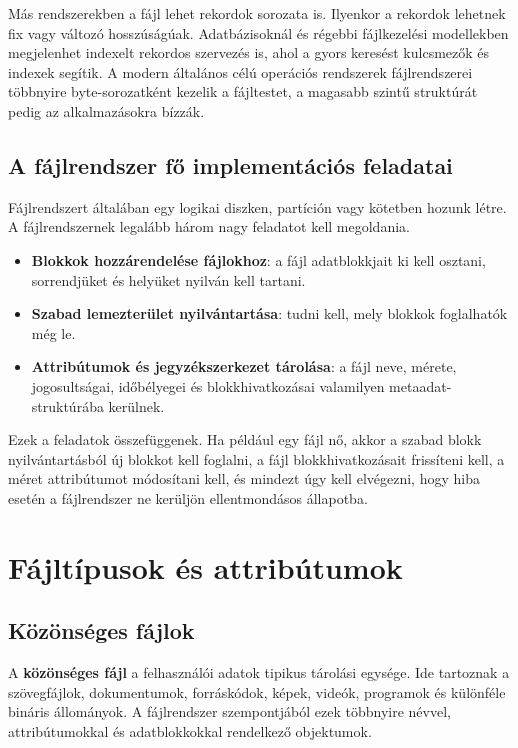 Más rendszerekben a fájl lehet rekordok sorozata is. Ilyenkor a rekordok lehetnek fix vagy változó hosszúságúak. Adatbázisoknál és régebbi fájlkezelési modellekben megjelenhet indexelt rekordos szervezés is, ahol a gyors keresést kulcsmezők és indexek segítik. A modern általános célú operációs rendszerek fájlrendszerei többnyire byte-sorozatként kezelik a fájltestet, a magasabb szintű struktúrát pedig az alkalmazásokra bízzák.

\subsection{A fájlrendszer fő implementációs feladatai}

Fájlrendszert általában egy logikai diszken, partíción vagy kötetben hozunk létre. A fájlrendszernek legalább három nagy feladatot kell megoldania.

\begin{itemize}
  \item \textbf{Blokkok hozzárendelése fájlokhoz}: a fájl adatblokkjait ki kell osztani, sorrendjüket és helyüket nyilván kell tartani.
  \item \textbf{Szabad lemezterület nyilvántartása}: tudni kell, mely blokkok foglalhatók még le.
  \item \textbf{Attribútumok és jegyzékszerkezet tárolása}: a fájl neve, mérete, jogosultságai, időbélyegei és blokkhivatkozásai valamilyen metaadat-struktúrába kerülnek.
\end{itemize}

Ezek a feladatok összefüggenek. Ha például egy fájl nő, akkor a szabad blokk nyilvántartásból új blokkot kell foglalni, a fájl blokkhivatkozásait frissíteni kell, a méret attribútumot módosítani kell, és mindezt úgy kell elvégezni, hogy hiba esetén a fájlrendszer ne kerüljön ellentmondásos állapotba.

\section{Fájltípusok és attribútumok}

\subsection{Közönséges fájlok}

A \textbf{közönséges fájl} a felhasználói adatok tipikus tárolási egysége. Ide tartoznak a szövegfájlok, dokumentumok, forráskódok, képek, videók, programok és különféle bináris állományok. A fájlrendszer szempontjából ezek többnyire névvel, attribútumokkal és adatblokkokkal rendelkező objektumok.

